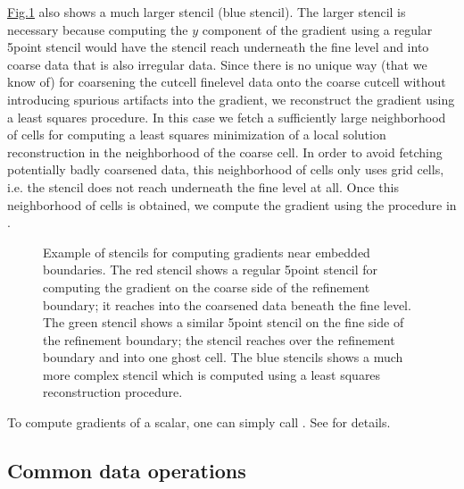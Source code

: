 \documentclass[letterpaper,10pt,english]{sphinxmanual}
\let\sphinxpxdimen\pdfpxdimen\else\newdimen\sphinxpxdimen
\begin{document}
\hyperref[\detokenize{Source/MeshData:fig-ebgradient}]{Fig.\@ \ref{\detokenize{Source/MeshData:fig-ebgradient}}} also shows a much larger stencil (blue stencil).
The larger stencil is necessary because computing the \(y\) component of the gradient using a regular 5\sphinxhyphen{}point stencil would have the stencil reach underneath the fine level and into coarse data that is also irregular data.
Since there is no unique way (that we know of) for coarsening the cut\sphinxhyphen{}cell fine\sphinxhyphen{}level data onto the coarse cut\sphinxhyphen{}cell without introducing spurious artifacts into the gradient, we reconstruct the gradient using a least squares procedure.
In this case we fetch a sufficiently large neighborhood of cells for computing a least squares minimization of a local solution reconstruction in the neighborhood of the coarse cell.
In order to avoid fetching potentially badly coarsened data, this neighborhood of cells only uses  grid cells, i.e. the stencil does not reach underneath the fine level at all.
Once this neighborhood of cells is obtained, we compute the gradient using the procedure in {\hyperref[\detokenize{Utilities/LeastSquares:chap-leastsquares}]{}}.

\begin{figure}[htb]
\centering
\capstart

\noindent\sphinxincludegraphics[width=480\sphinxpxdimen]{{EBGradient}.png}
\caption{Example of stencils for computing gradients near embedded boundaries.
The red stencil shows a regular 5\sphinxhyphen{}point stencil for computing the gradient on the coarse side of the refinement boundary; it reaches into the coarsened data beneath the fine level.
The green stencil shows a similar 5\sphinxhyphen{}point stencil on the fine side of the refinement boundary; the stencil reaches over the refinement boundary and into one ghost cell.
The blue stencils shows a much more complex stencil which is computed using a least squares reconstruction procedure.}\label{\detokenize{Source/MeshData:id1}}\label{\detokenize{Source/MeshData:fig-ebgradient}}\end{figure}

To compute gradients of a scalar, one can simply call .
See {\hyperref[\detokenize{Source/AmrMesh:chap-amrmesh}]{}} for details.


\subsection{Common data operations}
\label{\detokenize{Source/MeshData:common-data-operations}}
\end{document}
